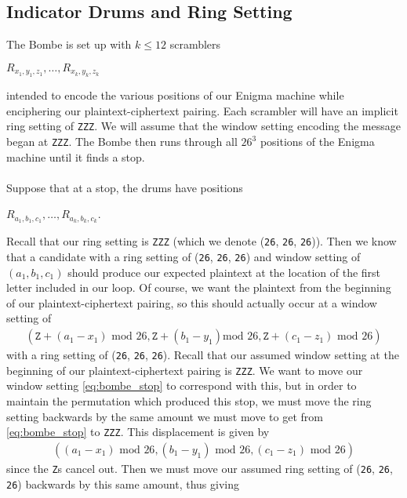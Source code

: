 \subsection{Indicator Drums and Ring Setting}
The Bombe is set up with $k\le12$ scramblers
\begin{center}
  $R_{x_1, y_1, z_1},\dots, R_{x_{k}, y_{k}, z_{k}}$
\end{center}
intended to encode the various positions of our Enigma machine while
enciphering our plaintext-ciphertext pairing. Each scrambler will
have an implicit ring setting of \texttt{ZZZ}. We will assume that
the window setting encoding the message began at \texttt{ZZZ}. The Bombe then
runs through all $26^3$ positions of the Enigma machine until it finds
a stop.
\\\\Suppose that at a stop, the drums have positions
\begin{center}
  $R_{a_1, b_1, c_1},\dots, R_{a_{k}, b_k, c_{k}}$.
\end{center}
Recall that our ring setting is \texttt{ZZZ} (which we denote
  (\texttt{26},
\texttt{26}, \texttt{26})). Then we know that a candidate with a ring
setting of (\texttt{26},
\texttt{26}, \texttt{26}) and window setting of $(a_1, b_1, c_1)$
should produce our expected plaintext at the location of the
first letter included in our loop. Of course, we want the plaintext
from the beginning of our plaintext-ciphertext pairing, so this
should actually occur at a window setting of
\begin{align}
  \label{eq:bombe_stop}
  (\texttt{Z} + (a_1-x_1)\text{ mod }26, \texttt{Z} + (b_1-y_1)\text{
  mod }26, \texttt{Z} + (c_1-z_1)\text{ mod }26)
\end{align}
with a ring setting of (\texttt{26},
\texttt{26}, \texttt{26}). Recall that our assumed window setting at
the beginning of our plaintext-ciphertext pairing is \texttt{ZZZ}. We
want to move our window setting \ref{eq:bombe_stop} to correspond
with this, but in order to maintain the permutation which produced this
stop, we must move the ring setting backwards by the same amount we
must move to get from \ref{eq:bombe_stop} to \texttt{ZZZ}. This displacement
is given by
\begin{align*}
  ((a_1-x_1)\text{ mod }26, (b_1-y_1)\text{ mod }26, (c_1-z_1)\text{ mod }26)
\end{align*}
since the \texttt{Z}s cancel out. Then we must move our assumed ring
setting of (\texttt{26},
\texttt{26}, \texttt{26}) backwards by this same amount, thus giving
